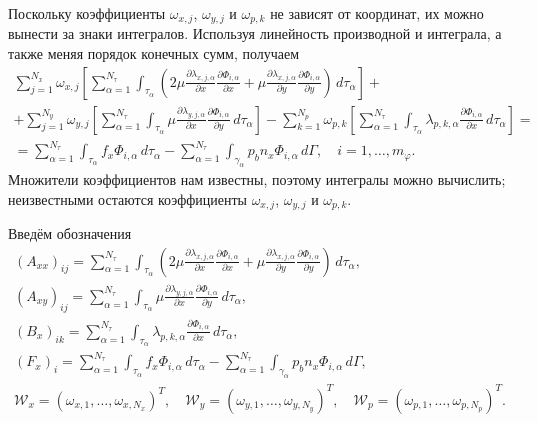 \documentclass[a4paper,14pt]{extarticle}
\begin{document}
Поскольку коэффициенты $\omega_{x,j}$, $\omega_{y,j}$
и $\omega_{p,k}$ не зависят от координат, их можно вынести
за знаки интегралов. Используя линейность производной и
интеграла, а также меняя порядок конечных сумм, получаем
\begin{equation}
	\begin{gathered}
		\sum_{j=1}^{N_x}
		\omega_{x,j}
		\left[
			\sum_{\alpha=1}^{N_\tau}
			\int_{\tau_\alpha}
			\left(
				2\mu
				\frac{\partial\lambda_{x,j,\alpha}}{\partial x}
				\frac{\partial\Phi_{i,\alpha}}{\partial x}
				+
				\mu
				\frac{\partial\lambda_{x,j,\alpha}}{\partial y}
				\frac{\partial\Phi_{i,\alpha}}{\partial y}
			\right)
			\,d\tau_\alpha
		\right]
		+\\[6pt]
		+
		\sum_{j=1}^{N_y}
		\omega_{y,j}
		\left[
			\sum_{\alpha=1}^{N_\tau}
			\int_{\tau_\alpha}
			\mu
			\frac{\partial\lambda_{y,j,\alpha}}{\partial x}
			\frac{\partial\Phi_{i,\alpha}}{\partial y}
			\,d\tau_\alpha
		\right]
		-
		\sum_{k=1}^{N_p}
		\omega_{p,k}
		\left[
			\sum_{\alpha=1}^{N_\tau}
			\int_{\tau_\alpha}
			\lambda_{p,k,\alpha}
			\frac{\partial\Phi_{i,\alpha}}{\partial x}
			\,d\tau_\alpha
		\right]
		=\\[6pt]
		=
		\sum_{\alpha=1}^{N_\tau}
		\int_{\tau_\alpha}
		f_x\Phi_{i,\alpha}\,d\tau_\alpha
		-
		\sum_{\alpha=1}^{N_\tau}
		\int_{\gamma_\alpha}
		p_b n_x\Phi_{i,\alpha}\,d\Gamma,
		\quad
		i=1,\ldots,m_\varphi.
	\end{gathered}
\end{equation}
Множители коэффициентов нам известны, поэтому интегралы можно вычислить; неизвестными остаются
коэффициенты $\omega_{x,j}$, $\omega_{y,j}$ и $\omega_{p,k}$.

Введём обозначения
\begin{equation}
	\begin{gathered}
		(A_{xx})_{ij}
		=
		\sum_{\alpha=1}^{N_\tau}
		\int_{\tau_\alpha}
		\left(
			2\mu
			\frac{\partial\lambda_{x,j,\alpha}}{\partial x}
			\frac{\partial\Phi_{i,\alpha}}{\partial x}
			+
			\mu
			\frac{\partial\lambda_{x,j,\alpha}}{\partial y}
			\frac{\partial\Phi_{i,\alpha}}{\partial y}
		\right)
		\,d\tau_\alpha,
		\\[6pt]
		(A_{xy})_{ij}
		=
		\sum_{\alpha=1}^{N_\tau}
		\int_{\tau_\alpha}
		\mu
		\frac{\partial\lambda_{y,j,\alpha}}{\partial x}
		\frac{\partial\Phi_{i,\alpha}}{\partial y}
		\,d\tau_\alpha,
		\\[6pt]
		(B_x)_{ik}
		=
		\sum_{\alpha=1}^{N_\tau}
		\int_{\tau_\alpha}
		\lambda_{p,k,\alpha}
		\frac{\partial\Phi_{i,\alpha}}{\partial x}
		\,d\tau_\alpha,
		\\[6pt]
		(F_x)_i
		=
		\sum_{\alpha=1}^{N_\tau}
		\int_{\tau_\alpha}
		f_x\Phi_{i,\alpha}\,d\tau_\alpha
		-
		\sum_{\alpha=1}^{N_\tau}
		\int_{\gamma_\alpha}
		p_b n_x\Phi_{i,\alpha}\,d\Gamma,
		\\[6pt]
		\mathcal W_x
		=
		(\omega_{x,1},\dots,\omega_{x,N_x})^T,
		\quad
		\mathcal W_y
		=
		(\omega_{y,1},\dots,\omega_{y,N_y})^T,
		\quad
		\mathcal W_p
		=
		(\omega_{p,1},\dots,\omega_{p,N_p})^T.
	\end{gathered}
\end{equation}
\end{document}
